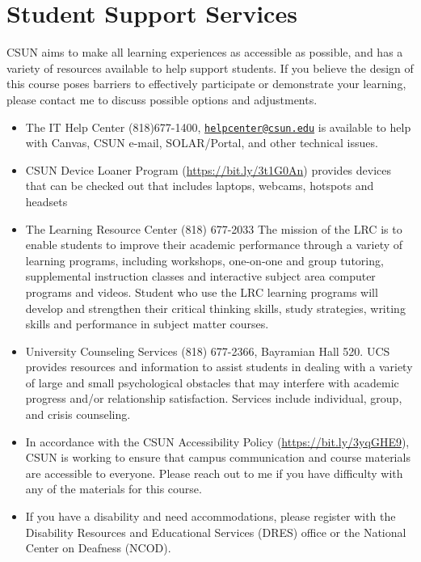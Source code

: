 \documentclass[11pt,]{article}
\providecommand{\tightlist}{%
  \setlength{\itemsep}{0pt}\setlength{\parskip}{0pt}}
\begin{document}
\hypertarget{student-support-services}{%
\section{Student Support Services}\label{student-support-services}}

CSUN aims to make all learning experiences as accessible as possible,
and has a variety of resources available to help support students. If
you believe the design of this course poses barriers to effectively
participate or demonstrate your learning, please contact me to discuss
possible options and adjustments.

\begin{itemize}
\tightlist
\item
  The IT Help Center (818)677-1400,
  \href{mailto:helpcenter@csun.edu}{\nolinkurl{helpcenter@csun.edu}} is
  available to help with Canvas, CSUN e-mail, SOLAR/Portal, and other
  technical issues.\\
\item
  CSUN Device Loaner Program (\url{https://bit.ly/3t1G0An}) provides
  devices that can be checked out that includes laptops, webcams,
  hotspots and headsets
\item
  The Learning Resource Center (818) 677-2033 The mission of the LRC is
  to enable students to improve their academic performance through a
  variety of learning programs, including workshops, one-on-one and
  group tutoring, supplemental instruction classes and interactive
  subject area computer programs and videos. Student who use the LRC
  learning programs will develop and strengthen their critical thinking
  skills, study strategies, writing skills and performance in subject
  matter courses.
\item
  University Counseling Services (818) 677-2366, Bayramian Hall 520. UCS
  provides resources and information to assist students in dealing with
  a variety of large and small psychological obstacles that may
  interfere with academic progress and/or relationship satisfaction.
  Services include individual, group, and crisis counseling.
\item
  In accordance with the CSUN Accessibility Policy
  (\url{https://bit.ly/3yqGHE9}), CSUN is working to ensure that campus
  communication and course materials are accessible to everyone. Please
  reach out to me if you have difficulty with any of the materials for
  this course.
\item
  If you have a disability and need accommodations, please register with
  the Disability Resources and Educational Services (DRES) office or the
  National Center on Deafness (NCOD).


\end{itemize}
\end{document}
